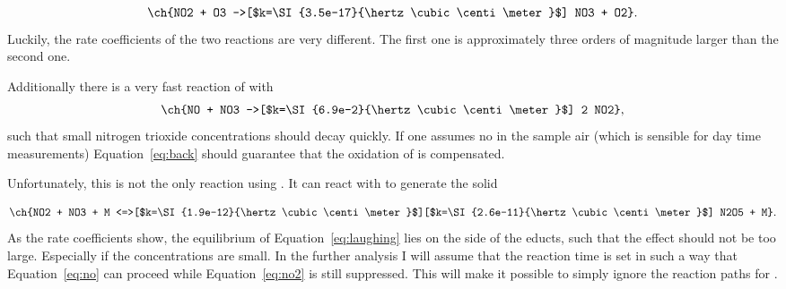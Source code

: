 \begin{align}
  \ch{NO2 + O3 ->[$k=\SI{3.5e-17}{\hertz\cubic\centi\meter}$] NO3
  + O2}. \label{eq:no2}
\end{align}
Luckily, the rate coefficients of the two reactions are very different.
The first one is approximately three orders of magnitude larger
than the second one.

Additionally there is a very fast reaction of  with 
\begin{align}
  \ch{NO + NO3 ->[$k=\SI{6.9e-2}{\hertz\cubic\centi\meter}$] 2 NO2},\label{eq:back}
\end{align}
such that small nitrogen trioxide concentrations should decay
quickly. If one assumes no  in the sample air (which is sensible
for day time measurements) Equation~\eqref{eq:back} should guarantee
that the oxidation of  is compensated. 

Unfortunately, this is not the only reaction using . It can
react with  to generate the solid 

\begin{align}
  \ch{NO2 + NO3 + M
  <=>[$k=\SI{1.9e-12}{\hertz\cubic\centi\meter}$][$k=\SI{2.6e-11}{\hertz\cubic\centi\meter}$]
  N2O5 + M}. \label{eq:laughing}
\end{align}
As the rate coefficients show, the equilibrium of
Equation~\eqref{eq:laughing} lies on the side of the educts, such that
the effect should not be too large. Especially if the 
concentrations are small. In the further analysis I will assume that
the reaction time is set in such a way that Equation~\eqref{eq:no}
can proceed while Equation~\eqref{eq:no2} is still suppressed. This
will make it possible to simply ignore the reaction paths for .

